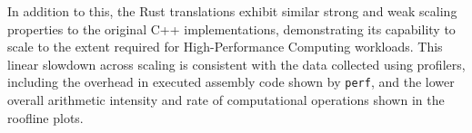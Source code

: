 In addition to this, the Rust translations exhibit similar strong and weak scaling properties to the original C++ implementations, demonstrating its capability to scale to the extent required for High-Performance Computing workloads. This linear slowdown across scaling is consistent with the data collected using profilers, including the overhead in executed assembly code shown by \texttt{perf}, and the lower overall arithmetic intensity and rate of computational operations shown in the roofline plots.

